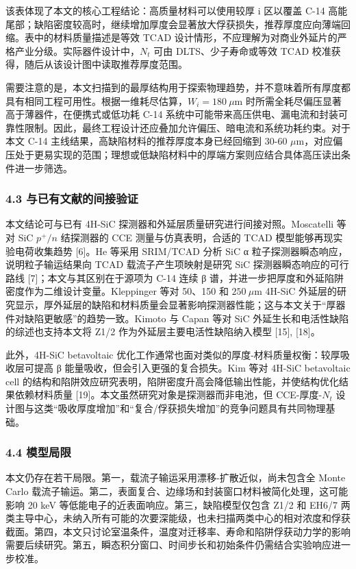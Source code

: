 \documentclass[
  10pt,
  a4paper,
]{ctexart}
\begin{document}
该表体现了本文的核心工程结论：高质量材料可以使用较厚 i 区以覆盖 C-14
高能尾部；缺陷密度较高时，继续增加厚度会显著放大俘获损失，推荐厚度应向薄端回缩。表中的材料质量描述是等效
TCAD
设计情形，不应理解为对商业外延片的严格产业分级。实际器件设计中，\(N_t\)
可由 DLTS、少子寿命或等效 TCAD
校准获得，随后从该设计图中读取推荐厚度范围。

需要注意的是，本文扫描到的最厚结构用于探索物理趋势，并不意味着所有厚度都具有相同工程可用性。根据一维耗尽估算，\(W_i=180\ \mu\mathrm{m}\)
时所需全耗尽偏压显著高于薄器件，在便携式或低功耗 C-14
系统中可能带来高压供电、漏电流和封装可靠性限制。因此，最终工程设计还应叠加允许偏压、暗电流和系统功耗约束。对于本文
C-14 主线结果，高缺陷材料的推荐厚度本身已经回缩到 30-60
\(\mu\)m，对应偏压处于更易实现的范围；理想或低缺陷材料中的厚端方案则应结合具体高压读出条件进一步筛选。

\subsubsection{4.3
与已有文献的间接验证}\label{ux4e0eux5df2ux6709ux6587ux732eux7684ux95f4ux63a5ux9a8cux8bc1}

本文结论可与已有 4H-SiC 探测器和外延层质量研究进行间接对照。Moscatelli
等对 SiC \(p^+/n\) 结探测器的 CCE 测量与仿真表明，合适的 TCAD
模型能够再现实验电荷收集趋势 {[}6{]}。He 等采用 SRIM/TCAD 分析 SiC α
粒子探测器瞬态响应，说明粒子输运结果向 TCAD 载流子产生项映射是研究 SiC
探测器瞬态响应的可行路线 {[}7{]}；本文与其区别在于源项为 C-14 连续 β
谱，并进一步把厚度和外延陷阱密度作为二维设计变量。Kleppinger 等对
50、150 和 \(250\ \mu\mathrm{m}\) 4H-SiC
外延层的研究显示，厚外延层的缺陷和材料质量会显著影响探测器性能；这与本文关于``厚器件对缺陷更敏感''的趋势一致。Kimoto
与 Capan 等对 SiC 外延生长和电活性缺陷的综述也支持本文将 Z1/2
作为外延层主要电活性缺陷纳入模型 {[}15{]}, {[}18{]}。

此外，4H-SiC betavoltaic
优化工作通常也面对类似的厚度-材料质量权衡：较厚吸收层可提高 β
能量吸收，但会引入更强的复合损失。Kim 等对 4H-SiC betavoltaic cell
的结构和陷阱效应研究表明，陷阱密度升高会降低输出性能，并使结构优化结果依赖材料质量
{[}19{]}。本文虽然研究对象是探测器而非电池，但 CCE-厚度-\(N_t\)
设计图与这类``吸收厚度增加''和``复合/俘获损失增加''的竞争问题具有共同物理基础。

\subsubsection{4.4 模型局限}\label{ux6a21ux578bux5c40ux9650}

本文仍存在若干局限。第一，载流子输运采用漂移-扩散近似，尚未包含全 Monte
Carlo
载流子输运。第二，表面复合、边缘场和封装窗口材料被简化处理，这可能影响
20 keV 等低能电子的近表面响应。第三，缺陷模型仅包含 Z1/2 和 EH6/7
两类主导中心，未纳入所有可能的次要深能级，也未扫描两类中心的相对浓度和俘获截面。第四，本文只讨论室温条件，温度对迁移率、寿命和陷阱俘获动力学的影响需要后续研究。第五，瞬态积分窗口、时间步长和初始条件仍需结合实验响应进一步校准。
\end{document}
